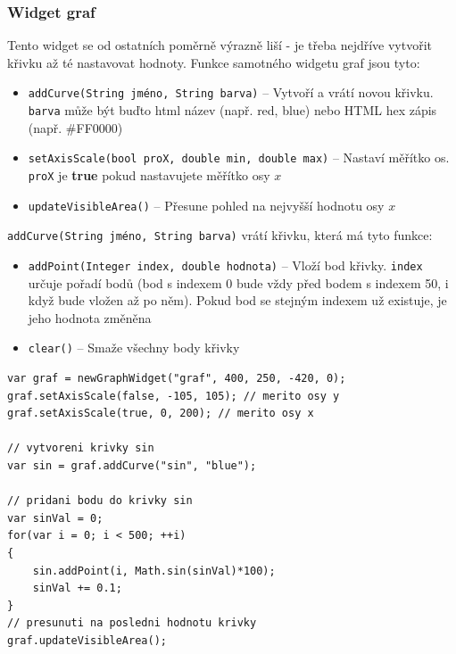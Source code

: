 \documentclass[12pt, a4paper, oneside]{article}
\newcommand{\It}{\textit}  %
\begin{document}
\subsubsection*{Widget graf}
Tento widget se od ostatních poměrně výrazně liší - je třeba nejdříve vytvořit křivku až té nastavovat hodnoty. Funkce samotného widgetu graf jsou tyto:
\begin{itemize}
    \item {\color{blue}\verb/addCurve(String jméno, String barva)/} -- Vytvoří a vrátí novou křivku. \verb/barva/ může být buďto html název (např. red, blue) nebo HTML hex zápis (např. \#FF0000)
    \item {\color{blue}\verb/setAxisScale(bool proX, double min, double max)/} -- Nastaví měřítko os. \verb/proX/ je {\bf true} pokud nastavujete měřítko osy $x$
    \item {\color{blue}\verb/updateVisibleArea()/} -- Přesune pohled na nejvyšší hodnotu osy $x$
\end{itemize}

{\color{blue}\verb/addCurve(String jméno, String barva)/} vrátí křivku, která má tyto funkce:

\begin{itemize}
    \item {\color{blue}\verb/addPoint(Integer index, double hodnota)/} -- Vloží bod křivky. \verb/index/ určuje pořadí bodů (bod s indexem 0 bude vždy před bodem s indexem 50, i když bude vložen až po něm). Pokud bod se stejným indexem už existuje, je jeho hodnota změněna
    \item {\color{blue}\verb/clear()/} -- Smaže všechny body křivky
\end{itemize}

\noindent\begin{minipage}{\textwidth}
\begin{lstlisting}[caption=Zobrazení křivky funkce sinus ve widgetu \It{graf}]
var graf = newGraphWidget("graf", 400, 250, -420, 0);
graf.setAxisScale(false, -105, 105); // merito osy y
graf.setAxisScale(true, 0, 200); // merito osy x

// vytvoreni krivky sin
var sin = graf.addCurve("sin", "blue"); 

// pridani bodu do krivky sin
var sinVal = 0;
for(var i = 0; i < 500; ++i)
{
    sin.addPoint(i, Math.sin(sinVal)*100);
    sinVal += 0.1;
}
// presunuti na posledni hodnotu krivky
graf.updateVisibleArea(); 
\end{lstlisting}
\end{minipage}
\end{document}

